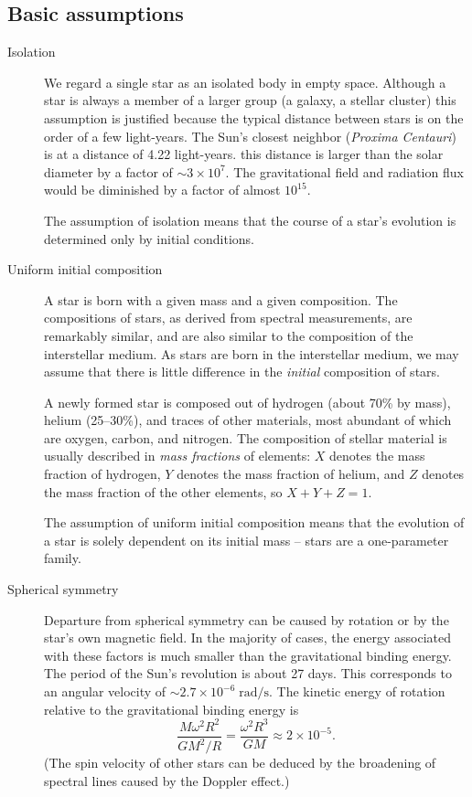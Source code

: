 \documentclass[]{article}
\newcommand{\unit}[1]{\;\mathrm{#1}}
\begin{document}
\subsection{Basic assumptions}
\begin{description}

\item[Isolation] We regard a single star as an isolated body in empty space.
Although a star is always a member of a larger group (a galaxy, a stellar
cluster) this assumption is justified because the typical distance between stars
is on the order of a few light-years. The Sun's closest neighbor (\emph{Proxima
Centauri}) is at a distance of 4.22 light-years. this distance is larger than
the solar diameter by a factor of $\sim{3}\times{10^7}$. The gravitational field
and radiation flux would be diminished by a factor of almost $10^{15}$.

The assumption of isolation means that the course of a star's evolution is
determined only by initial conditions.

\item[Uniform initial composition] A star is born with a given mass and a given
composition. The compositions of stars, as derived from spectral measurements,
are remarkably similar, and are also similar to the composition of the
interstellar medium. As stars are born in the interstellar medium, we may assume
that there is little difference in the \emph{initial} composition of stars.

A newly formed star is composed out of hydrogen (about 70\% by mass), helium
(25--30\%), and traces of other materials, most abundant of which are oxygen,
carbon, and nitrogen. The composition of stellar material is usually described
in \emph{mass fractions} of elements: $X$ denotes the mass fraction of hydrogen,
$Y$ denotes the mass fraction of helium, and $Z$ denotes the mass fraction of
the other elements, so $X+Y+Z=1$.

The assumption of uniform initial composition means that the evolution of a star
is solely dependent on its initial mass -- stars are a one-parameter family.

\item[Spherical symmetry] Departure from spherical symmetry can be caused by
rotation or by the star's own magnetic field. In the majority of cases, the
energy associated with these factors is much smaller than the gravitational
binding energy. The period of the Sun's revolution is about 27 days. This
corresponds to an angular velocity of $\sim{2.7}\times10^{-6}\unit{rad/s}$. The
kinetic energy of rotation relative to the gravitational binding energy is
\begin{equation*}
\frac{M\omega^2R^2}{GM^2/R}=\frac{\omega^2R^3}{GM}\approx2\times10^{-5}.
\end{equation*}
(The spin velocity of other stars can be deduced by the broadening of spectral
lines caused by the Doppler effect.)


\end{description}
\end{document}
